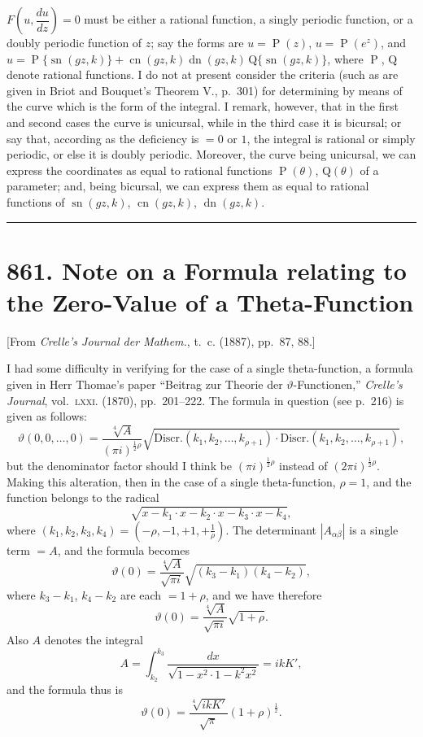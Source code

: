 \documentclass[11pt,a4paper]{article}
\theoremstyle{definition}
\DeclareMathOperator{\Pf}{P}
\DeclareMathOperator{\sn}{sn}
\DeclareMathOperator{\cn}{cn}
\DeclareMathOperator{\dn}{dn}
\begin{document}
$F\!\left(u, \dfrac{du}{dz}\right) = 0$ must be either a rational function, a singly periodic function, or a doubly periodic function of $z$; say the forms are $u = \Pf(z)$, $u = \Pf(e^z)$, and $u = \Pf\{\sn(gz, k)\} + \cn(gz, k)\dn(gz, k)\, \mathrm{Q}\{\sn(gz, k)\}$, where $\Pf$, $\mathrm{Q}$ denote rational functions. I do not at present consider the criteria (such as are given in Briot and Bouquet's Theorem V., p.~301) for determining by means of the curve which is the form of the integral. I remark, however, that in the first and second cases the curve is unicursal, while in the third case it is bicursal; or say that, according as the deficiency is $= 0$ or $1$, the integral is rational or simply periodic, or else it is doubly periodic. Moreover, the curve being unicursal, we can express the coordinates as equal to rational functions $\Pf(\theta)$, $\mathrm{Q}(\theta)$ of a parameter; and, being bicursal, we can express them as equal to rational functions of $\sn(gz, k)$, $\cn(gz, k)$, $\dn(gz, k)$.

\vspace{12pt}
\hrule
\vspace{12pt}

\section*{861. Note on a Formula relating to the Zero-Value of a Theta-Function}

\begin{center}
[From \textit{Crelle's Journal der Mathem.}, t.~c. (1887), pp.~87, 88.]
\end{center}

I had some difficulty in verifying for the case of a single theta-function, a formula given in Herr Thomae's paper ``Beitrag zur Theorie der $\vartheta$-Functionen,'' \textit{Crelle's Journal}, vol.~\textsc{lxxi}. (1870), pp.~201--222. The formula in question (see p.~216) is given as follows:
\[
\vartheta(0, 0, \ldots, 0) = \frac{\sqrt[4]{A}}{(\pi i)^{\frac{1}{2}\rho}} \sqrt{\text{Discr.}(k_1, k_2, \ldots, k_{\rho+1}) \cdot \text{Discr.}(k_1, k_2, \ldots, k_{\rho+1})},
\]
but the denominator factor should I think be $(\pi i)^{\frac{1}{2}\rho}$ instead of $(2\pi i)^{\frac{1}{2}\rho}$. Making this alteration, then in the case of a single theta-function, $\rho = 1$, and the function belongs to the radical
\[
\sqrt{x - k_1 \cdot x - k_2 \cdot x - k_3 \cdot x - k_4},
\]
where $(k_1, k_2, k_3, k_4) = (-\rho, -1, +1, +\frac{1}{\rho})$. The determinant $|A_{\alpha\beta}|$ is a single term $= A$, and the formula becomes
\[
\vartheta(0) = \frac{\sqrt[4]{A}}{\sqrt{\pi i}} \sqrt{(k_3 - k_1)(k_4 - k_2)},
\]
where $k_3 - k_1$, $k_4 - k_2$ are each $= 1 + \rho$, and we have therefore
\[
\vartheta(0) = \frac{\sqrt[4]{A}}{\sqrt{\pi i}} \sqrt{1 + \rho}.
\]
Also $A$ denotes the integral
\[
A = \int_{k_2}^{k_3} \frac{dx}{\sqrt{1 - x^2 \cdot 1 - k^2 x^2}} = ikK',
\]
and the formula thus is
\[
\vartheta(0) = \frac{\sqrt[4]{ikK'}}{\sqrt{\pi}} (1 + \rho)^{\frac{1}{2}}.
\]
\end{document}
